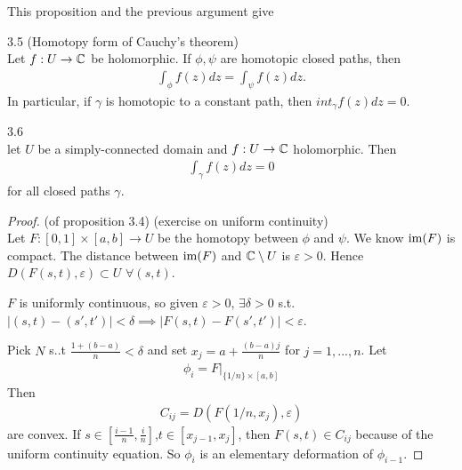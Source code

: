 \documentclass[a4paper]{article}
\begin{document}
This proposition and the previous argument give
\begin{thm} 3.5 (Homotopy form of Cauchy's theorem)\\
Let $f:U \to \mathbb{C}$ be holomorphic. If $\phi,\psi$ are homotopic closed paths, then
\begin{equation*}
\begin{aligned}
\int_\phi f(z) dz = \int_\psi f(z) dz.
\end{aligned}
\end{equation*}
In particular, if $\gamma$ is homotopic to a constant path, then $int_\gamma f(z) dz = 0$.
\end{thm}

\begin{coro} 3.6\\
let $U$ be a simply-connected domain and $f:U \to \mathbb{C}$ holomorphic. Then
\begin{equation*}
\begin{aligned}
\int_\gamma f(z) dz = 0
\end{aligned}
\end{equation*}
for all closed paths $\gamma$.
\end{coro}

\begin{proof} (of proposition 3.4) (exercise on uniform continuity)\\
Let $F: [0,1]\times [a,b] \to U$ be the homotopy between $\phi$ and $\psi$. We know $\operatorname{im}(F)$ is compact. The distance between $\operatorname{im}(F)$ and $\mathbb{C}\setminus U$ is $\varepsilon>0$. Hence $D(F(s,t),\varepsilon) \subset U$ $\forall (s,t)$.

$F$ is uniformly continuous, so given $\varepsilon>0$, $\exists \delta>0$ s.t. $|(s,t)-(s',t')|<\delta \implies |F(s,t)-F(s',t')| < \varepsilon$.

Pick $N$ s..t $\frac{1+(b-a)}{n} < \delta$ and set $x_j = a+\frac{(b-a)j}{n}$ for $j=1,...,n$. Let
\begin{equation*}
\begin{aligned}
\phi_i = F|_{\{1/n\} \times [a,b]}
\end{aligned}
\end{equation*}
Then
\begin{equation*}
\begin{aligned}
C_{ij} = D(F(1/n,x_j),\varepsilon)
\end{aligned}
\end{equation*}
are convex. If $s \in [\frac{i-1}{n},\frac{i}{n}]$,$t\in[x_{j-1},x_j]$, then $F(s,t) \in C_{ij}$ because of the uniform continuity equation. So $\phi_i$ is an elementary deformation of $\phi_{i-1}$.
\end{proof}
\end{document}
